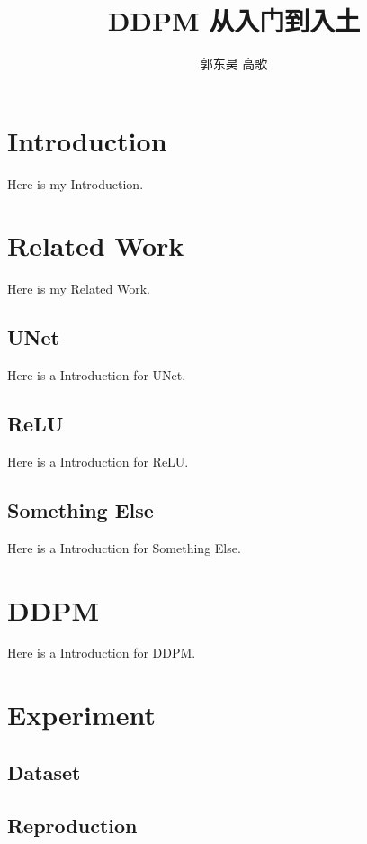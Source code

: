 \documentclass{ctexart}
\title{DDPM 从入门到入土}
\author{郭东昊 高歌}
\begin{document}
\maketitle

\section{Introduction}

\noindent Here is my Introduction.

\section{Related Work}

Here is my Related Work.

\subsection{UNet}

Here is a Introduction for UNet.

\subsection{ReLU}

Here is a Introduction for ReLU.

\subsection{Something Else}

Here is a Introduction for Something Else.

\section{DDPM}

\noindent Here is a Introduction for DDPM.

\section{Experiment}

\subsection{Dataset}

\subsection{Reproduction}
\end{document}
